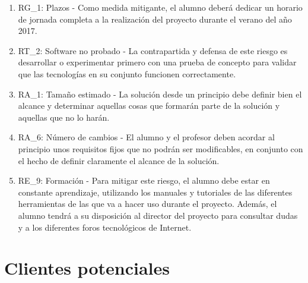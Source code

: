 \begin{enumerate}
\begin{enumerate}
\item RG\_1: Plazos - Como medida mitigante, el alumno deberá dedicar un horario de jornada completa a la realización del proyecto durante el verano del año 2017. 
\item RT\_2: Software no probado - La contrapartida y defensa de este riesgo es desarrollar o experimentar primero con una prueba de concepto para validar que las tecnologías en su conjunto funcionen correctamente. 
\item RA\_1: Tamaño estimado - La solución desde un principio debe definir bien el alcance y determinar aquellas cosas que formarán parte de la solución y aquellas que no lo harán. 
\item RA\_6: Número de cambios - El alumno y el profesor deben acordar al principio unos requisitos fijos que no podrán ser modificables, en conjunto con el hecho de definir claramente el alcance de la solución.
\item RE\_9: Formación - Para mitigar este riesgo, el alumno debe estar en constante aprendizaje, utilizando los manuales y tutoriales de las diferentes herramientas de las que va a hacer uso durante el proyecto. Además, el alumno tendrá a su disposición al director del proyecto para consultar dudas y a los diferentes foros tecnológicos de Internet. 
\end{enumerate}
\end{enumerate}

\section{Clientes potenciales} \label{b.clientes.potenciales}
